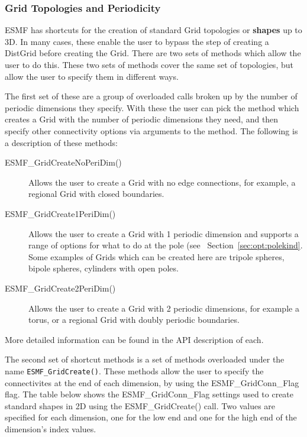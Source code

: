 \subsubsection{Grid Topologies and Periodicity}
\label{sec:ShapeShortcut}
\begin{sloppypar}
ESMF has shortcuts for the creation of standard Grid topologies 
or {\bf shapes} up to 3D.  In many cases, these enable the user to
bypass the step of creating a DistGrid before creating the Grid. 
There are two sets of methods which allow the user to do this. These two sets of methods cover the same set of topologies, but
allow the user to specify them in different ways.

 The first set of these are a group of overloaded
calls broken up by the number of periodic dimensions they specify. With these the user can pick 
the method which creates a Grid with the number of periodic dimensions they need, and then specify other connectivity 
options via arguments to the method. The following is a description of these methods:  
\end{sloppypar}

\medskip

\begin{description}
\item [ESMF\_GridCreateNoPeriDim()] Allows the user to create a Grid with no edge connections, for example, a regional Grid with closed boundaries.

\item [ESMF\_GridCreate1PeriDim()] Allows the user to create a Grid with 1 periodic dimension and supports a range of options for what to do at the pole (see ~Section~\ref{sec:opt:polekind}. Some examples of Grids which can be created here are tripole spheres, bipole spheres, cylinders with open poles. 

\item [ESMF\_GridCreate2PeriDim()] Allows the user to create a Grid with 2 periodic dimensions, for example a torus, or a regional Grid with
doubly periodic boundaries. 
\end{description}

More detailed information can be found in the API description of each.

\medskip

\begin{sloppypar}
The second set of shortcut methods is a set of methods overloaded under the name {\tt ESMF\_GridCreate()}. These methods
allow the user to specify the connectivites at the end of each dimension, by using the ESMF\_GridConn\_Flag flag. The table below shows the ESMF\_GridConn\_Flag settings used to create 
standard shapes in 2D using the ESMF\_GridCreate() call.  Two values
are specified for each dimension, one for the low end and one for 
the high end of the dimension's index values. 
\end{sloppypar}

